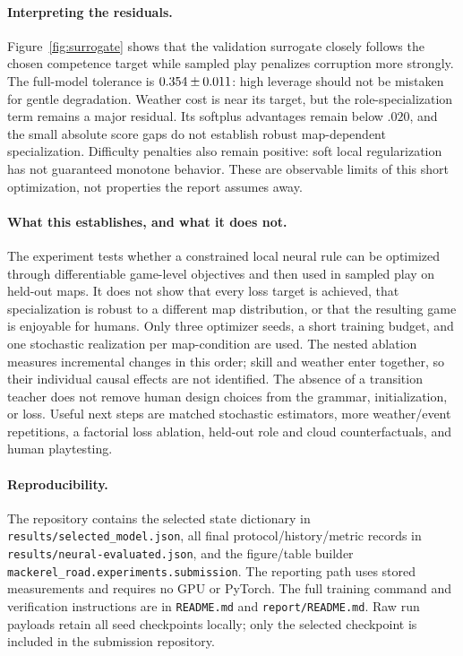 \paragraph{Interpreting the residuals.}
Figure~\ref{fig:surrogate} shows that the validation surrogate closely follows
the chosen competence target while sampled play penalizes corruption more
strongly. The full-model tolerance is $0.354\pm0.011$: high leverage should
not be mistaken for gentle degradation. Weather cost is near its target, but
the role-specialization term remains a major residual. Its softplus advantages
remain below $.020$, and the small absolute score gaps do not establish robust
map-dependent specialization. Difficulty penalties also remain positive: soft
local regularization has not guaranteed monotone behavior. These are observable
limits of this short optimization, not properties the report assumes away.

\paragraph{What this establishes, and what it does not.}
The experiment tests whether a constrained local neural rule can be optimized
through differentiable game-level objectives and then used in sampled play on
held-out maps. It does not show that every loss target is achieved, that
specialization is robust to a different map distribution, or that the resulting
game is enjoyable for humans. Only three optimizer seeds, a short training
budget, and one stochastic realization per map-condition are used. The nested
ablation measures incremental changes in this order; skill and weather enter
together, so their individual causal effects are not identified. The absence
of a transition teacher does not remove human design choices from the grammar,
initialization, or loss. Useful next steps are matched stochastic estimators,
more weather/event repetitions, a factorial loss ablation, held-out role and
cloud counterfactuals, and human playtesting.

\paragraph{Reproducibility.}
The repository contains the selected state dictionary in
\texttt{results/selected\_model.json}, all final protocol/history/metric records
in \texttt{results/neural-evaluated.json}, and the figure/table builder
\texttt{mackerel\_road.experiments.submission}. The reporting path uses stored
measurements and requires no GPU or PyTorch. The full training command and
verification instructions are in \texttt{README.md} and
\texttt{report/README.md}. Raw run payloads retain all seed checkpoints locally;
only the selected checkpoint is included in the submission repository.

